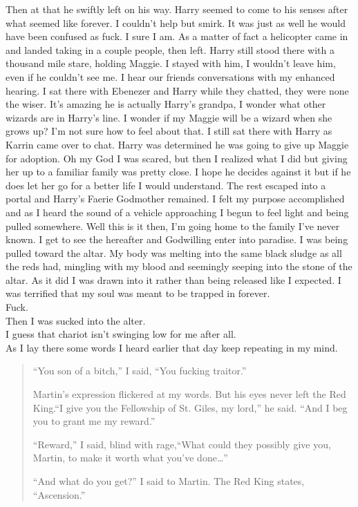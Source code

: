 Then at that he swiftly left on his way. Harry seemed to come to his senses after what seemed like forever. I couldn't help but smirk. It was just as well he would have been confused as fuck. I sure I am.  As a matter of fact a helicopter came in and landed taking in a couple people, then left. Harry still stood there with a thousand mile stare, holding Maggie. I stayed with him, I wouldn't leave him, even if he couldn't see me. I hear our friends conversations with my enhanced hearing. I sat there with Ebenezer and Harry while they chatted, they were none the wiser. It's amazing he is actually Harry's grandpa, I wonder what other wizards are in Harry's line. I wonder if my Maggie will be a wizard when she grows up? I'm not sure how to feel about that. I still sat there with Harry as Karrin came over to chat. Harry was determined he was going to give up Maggie for adoption. Oh my God I was scared, but then I realized what I did but giving her up to a familiar family was pretty close. I hope he decides against it but if he does let her go for a better life I would understand. The rest escaped into a portal and Harry's Faerie Godmother remained. I felt my purpose accomplished and as I heard the sound of a vehicle approaching I begun to feel light and being pulled somewhere. Well this is it then, I'm going home to the family I've never known. I get to see the hereafter and Godwilling enter into paradise. I was being pulled toward the altar. My body was melting into the same black sludge as all the reds had, mingling with my blood and seemingly seeping into the stone of the altar. As it did I was drawn into it rather than being released like I expected. I was terrified that my soul was meant to be trapped in \chichenitza forever.\\

Fuck.\\

Then I was sucked into the alter.\\

I guess that chariot isn't swinging low for me after all.\\

As I lay there some words I heard earlier that day keep repeating in my mind.
\begin{quotation}
	``You son of a bitch,'' I said, ``You fucking traitor.''
	
	Martin’s expression flickered at my words. But his eyes never left the Red King.``I give you the Fellowship of St. Giles, my lord,'' he said. ``And I beg you to grant me my reward.''
	
	``Reward,'' I said, blind with rage,``What could they possibly give you, Martin, to make it worth what you’ve done\dots''

	``And what do you get?'' I said to Martin.
	The Red King states, ``Ascension.''
\end{quotation}

